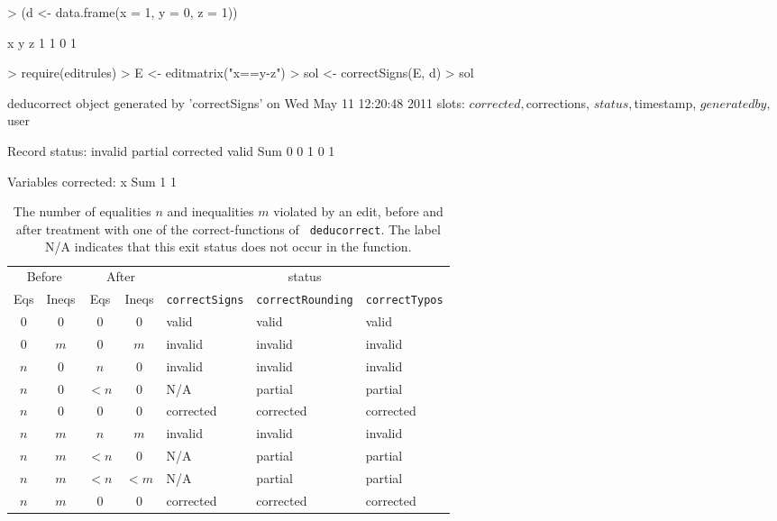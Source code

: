 \documentclass[11pt, fleqn, a4paper]{article}
\begin{document}
\begin{Schunk}
\begin{Sinput}
> (d <- data.frame(x = 1, y = 0, z = 1))
\end{Sinput}
\begin{Soutput}
  x y z
1 1 0 1
\end{Soutput}
\begin{Sinput}
> require(editrules)
> E <- editmatrix("x==y-z")
> sol <- correctSigns(E, d)
> sol
\end{Sinput}
\begin{Soutput}
 deducorrect object generated by 'correctSigns' on Wed May 11 12:20:48 2011
 slots:  $corrected, $corrections, $status, $timestamp, $generatedby, $user

 Record status:
  invalid   partial corrected     valid       Sum 
        0         0         1         0         1 

 Variables corrected:
  x Sum 
  1   1 
\end{Soutput}
\end{Schunk}
%
%
\begin{table}
\begin{threeparttable}
\caption{The number of equalities $n$ and inequalities $m$ violated by an edit,
before and after treatment with one of the correct-functions of {\tt
deducorrect}. The label {\rm N/A} indicates that this exit status does not
occur in the function.}
\label{statusvalues}
\begin{tabular}{cccclll}
\hline
\multicolumn{2}{c}{Before}&\multicolumn{2}{c}{After}&\multicolumn{3}{c}{status}\\
Eqs&  Ineqs &  Eqs  &Ineqs   &{\tt correctSigns}   & {\tt correctRounding} &{\tt correctTypos}\\
\hline
$0$  &  $0$     &  $0$    &$0$      &valid          & valid           &valid\\
$0$  &  $m$     &  $0$    &$m$      &invalid        & invalid         &invalid\\
$n$  &  $0$     &  $n$    &$0$      &invalid        & invalid         &invalid\\
$n$  &  $0$     &  $<n$   &$0$      &N/A              & partial         &partial\\
$n$  &  $0$     &  $0$    &$0$      &corrected      & corrected       &corrected\\
$n$  &  $m$     &  $n$    &$m$      &invalid        & invalid         &invalid\\
$n$  &  $m$     &  $<n$   &$0$      &N/A               & partial         &partial\\
$n$  &  $m$     &  $<n$   &$<m$     &N/A               & partial         &partial\\
$n$  &  $m$     &  $0$    &$0$      &corrected      &corrected        &corrected\\
\hline
\end{tabular}
\end{threeparttable}
\end{table}
\end{document}
